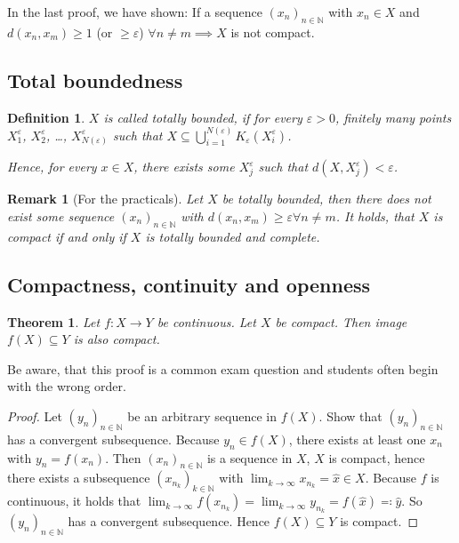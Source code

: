 \documentclass{article}
\newtheorem{theorem}{Theorem}  \numberwithin{theorem}{section}
\newtheorem{definition}{Definition}  \numberwithin{definition}{section}
\newtheorem{remark}{Remark}  \numberwithin{remark}{section}
\begin{document}
In the last proof, we have shown: If a sequence $(x_n)_{n \in \mathbb N}$ with $x_n \in X$ and $d(x_n, x_m) \geq 1$ (or $\geq \varepsilon$) $\forall n \neq m \implies X$ is not compact.

\subsection{Total boundedness}

\begin{definition}
  $X$ is called totally bounded, if for every $\varepsilon > 0$, finitely many points $X_1^\varepsilon$, $X_2^\varepsilon$, \dots, $X_{N(\varepsilon)}^\varepsilon$ such that $X \subseteq \bigcup_{i=1}^{N(\varepsilon)} K_{\varepsilon}(X_i^\varepsilon)$.

  Hence, for every $x \in X$, there exists some $X_j^\varepsilon$ such that $d(X, X_j^\varepsilon) < \varepsilon$.
\end{definition}

\begin{remark}[For the practicals]
  Let $X$ be totally bounded, then there does not exist some sequence $(x_n)_{n \in \mathbb N}$ with $d(x_n, x_m) \geq \varepsilon \forall n \neq m$. It holds, that $X$ is compact if and only if $X$ is totally bounded and complete.
\end{remark}

\subsection{Compactness, continuity and openness}
\begin{theorem} %
  \label{satz6}
  Let $f: X \to Y$ be continuous. Let $X$ be compact. Then image $f(X) \subseteq Y$ is also compact.
\end{theorem}

Be aware, that this proof is a common exam question and students often begin with the wrong order.

\begin{proof}
  Let $(y_n)_{n \in \mathbb N}$ be an arbitrary sequence in $f(X)$. Show that $(y_n)_{n\in\mathbb N}$ has a convergent subsequence.
  Because $y_n \in f(X)$, there exists at least one $x_n$ with $y_n = f(x_n)$.
  Then $(x_n)_{n \in \mathbb N}$ is a sequence in $X$, $X$ is compact, hence there exists a subsequence $(x_{n_k})_{k \in \mathbb N}$ with $\lim_{k\to\infty} x_{n_k} = \hat{x} \in X$. Because $f$ is continuous, it holds that $\lim_{k\to\infty} f(x_{n_k}) = \lim_{k\to\infty} y_{n_k} = f(\hat{x}) \eqqcolon \hat{y}$.
  So $(y_n)_{n\in\mathbb N}$ has a convergent subsequence. Hence $f(X) \subseteq Y$ is compact.
\end{proof}
\end{document}
